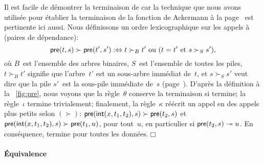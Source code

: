 Il est facile de démontrer la terminaison de
 car la technique que nous avons
utilisée pour établier la terminaison de la fonction de Ackermann à la
page~\pageref{par:ackermann} est pertinente ici aussi. Nous
définissons un ordre lexicographique sur les appels à 
(paires de dépendance):
\begin{equation}
\textsf{pre}(t,s) \succ \textsf{pre}(t',s') :\Leftrightarrow \text{\(t
  \succ_{B} t'\) ou (\(t = t'\) et \(s \succ_{S} s'\))},
\label{eq:BS_order}
\end{equation}
où \(B\)~est l'ensemble des arbres binaires, \(S\)~est l'ensemble de
toutes les piles, \(t \succ_{B} t'\) signifie que l'arbre~\(t'\) est
un sous-arbre immédiat
de~\(t\), et \(s \succ_{S} s'\) veut dire que la pile \(s'\)~est la
sous-pile immédiate
de~\(s\) (page~\pageref{par:well-founded}). D'après la définition à la
\fig~\vref{fig:pre}, nous voyons que la règle~\(\theta\) conserve la
terminaison si  termine; la
règle~\(\iota\) termine trivialement; finalement, la règle~\(\kappa\)
réécrit un appel en des appels plus petits selon \((\succ)\):
\(\textsf{pre}(\textsf{int}(x,t_1,t_2),s) \succ \textsf{pre}(t_2,s)\) et
\(\textsf{pre}(\textsf{int}(x,t_1,t_2),s) \succ \textsf{pre}(t_1,u)\), pour
tout~\(u\), en particulier si \(\textsf{pre}(t_2,s) \twoheadrightarrow
u\). En conséquence,  termine pour
toutes les données.\hfill\(\Box\)

\paragraph{Équivalence}


